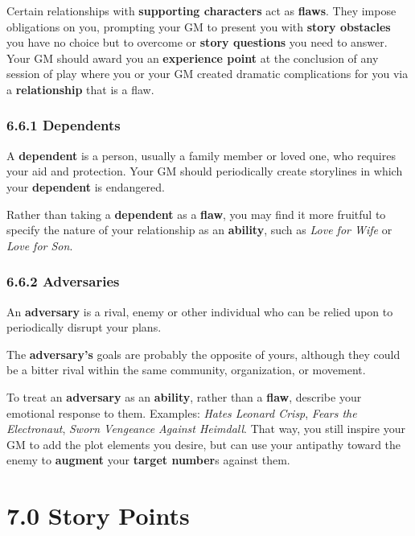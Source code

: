 \documentclass[
  11pt,
]{article}
\begin{document}
Certain relationships with \textbf{supporting characters} act as
\textbf{flaws}. They impose obligations on you, prompting your GM to
present you with \textbf{story obstacles} you have no choice but to
overcome or \textbf{story questions} you need to answer. Your GM should
award you an \textbf{experience point} at the conclusion of any session
of play where you or your GM created dramatic complications for you via
a \textbf{relationship} that is a flaw.

\hypertarget{dependents}{%
\subsubsection{6.6.1 Dependents}\label{dependents}}

A \textbf{dependent} is a person, usually a family member or loved one,
who requires your aid and protection. Your GM should periodically create
storylines in which your \textbf{dependent} is endangered.

Rather than taking a \textbf{dependent} as a \textbf{flaw}, you may find
it more fruitful to specify the nature of your relationship as an
\textbf{ability}, such as \emph{Love for Wife} or \emph{Love for Son}.

\hypertarget{adversaries}{%
\subsubsection{6.6.2 Adversaries}\label{adversaries}}

An \textbf{adversary} is a rival, enemy or other individual who can be
relied upon to periodically disrupt your plans.

The \textbf{adversary's} goals are probably the opposite of yours,
although they could be a bitter rival within the same community,
organization, or movement.

To treat an \textbf{adversary} as an \textbf{ability}, rather than a
\textbf{flaw}, describe your emotional response to them. Examples:
\emph{Hates Leonard Crisp}, \emph{Fears the Electronaut}, \emph{Sworn
Vengeance Against Heimdall}. That way, you still inspire your GM to add
the plot elements you desire, but can use your antipathy toward the
enemy to \textbf{augment} your \textbf{target number}s against them.

\hypertarget{story-points}{%
\section{7.0 Story Points}\label{story-points}}
\end{document}
